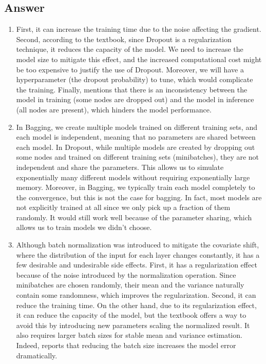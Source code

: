 \documentclass[
	12pt, %
]{../Template/fphw}
\begin{document}

\subsection*{Answer}
\begin{enumerate}[label = (\arabic*)]
    \item First, it can increase the training time due to the noise affecting the gradient. Second, according to the textbook, since Dropout is a regularization technique, it reduces the capacity of the model. We need to increase the model size to mitigate this effect, and the increased computational cost might be too expensive to justify the use of Dropout. Moreover, we will have a hyperparameter (the dropout probability) to tune, which would complicate the training. Finally, \cite{liang2021rdrop} mentions that there is an inconsistency between the model in training (some nodes are dropped out) and the model in inference (all nodes are present), which hinders the model performance.

    \item In Bagging, we create multiple models trained on different training sets, and each model is independent, meaning that no parameters are shared between each model. In Dropout, while multiple models are created by dropping out some nodes and trained on different training sets (minibatches), they are not independent and share the parameters. This allows us to simulate exponentially many different models without requiring exponentially large memory. Moreover, in Bagging, we typically train each model completely to the convergence, but this is not the case for bagging. In fact, most models are not explicitly trained at all since we only pick up a fraction of them randomly. It would still work well because of the parameter sharing, which allows us to train models we didn't choose.

    \item Although batch normalization was introduced to mitigate the covariate shift, where the distribution of the input for each layer changes constantly, it has a few desirable and undesirable side effects. First, it has a regularization effect because of the noise introduced by the normalization operation. Since minibatches are chosen randomly, their mean and the variance naturally contain some randomness, which improves the regularization. Second, it can reduce the training time. On the other hand, due to its regularization effect, it can reduce the capacity of the model, but the textbook offers a way to avoid this by introducing new parameters scaling the normalized result. It also requires larger batch sizes for stable mean and variance estimation. Indeed, \cite{groupnorm} reports that reducing the batch size increases the model error dramatically.


\end{enumerate}
\end{document}
